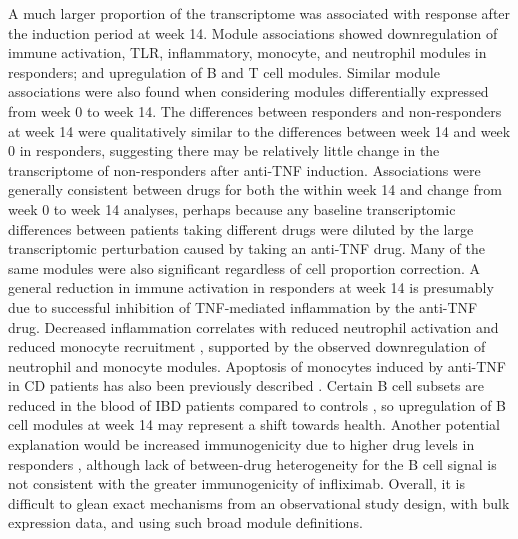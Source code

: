 A much larger proportion of the transcriptome was associated with response after the induction period at week 14.
Module associations
showed downregulation of immune activation, \gls{TLR}, inflammatory, monocyte, and neutrophil modules in responders;
and upregulation of B and T cell modules.
Similar module associations were also found when considering modules differentially expressed from week 0 to week 14.
The differences between responders and non-responders at week 14 
were qualitatively similar to the differences between week 14 and week 0 in responders,
suggesting there may be relatively little change in the transcriptome of non-responders after anti-\gls{TNF} induction.
Associations were generally consistent between drugs for both the within week 14 and change from week 0 to week 14 analyses,
perhaps because any baseline transcriptomic differences between patients taking different drugs 
were diluted by the large transcriptomic perturbation caused by taking an anti-\gls{TNF} drug.
Many of the same modules were also significant regardless of cell proportion correction.
%
A general reduction in immune activation in responders at week 14 is presumably due to successful inhibition of \gls{TNF}-mediated inflammation by the anti-\gls{TNF} drug.
%
%
%
Decreased inflammation correlates with reduced neutrophil activation and reduced monocyte recruitment \autocite{pramekumar2018PartnersCrimeNeutrophils},
supported by the observed downregulation of neutrophil and monocyte modules.
Apoptosis of monocytes induced by anti-\gls{TNF} in \gls{CD} patients has also been previously described \autocite{lugering2001InfliximabInducesApoptosis}.
Certain B cell subsets are reduced in the blood of \gls{IBD} patients compared to controls \autocite{pararasa2019ReducedCD27IgDCells}, 
so upregulation of B cell modules at week 14 may represent a shift towards health.
Another potential explanation would be increased immunogenicity due to higher drug levels in responders \autocite{kennedy2019PredictorsAntiTNFTreatment},
although lack of between-drug heterogeneity for the B cell signal is not consistent with the greater immunogenicity of infliximab.
Overall, it is difficult to glean exact mechanisms from an observational study design, with bulk expression data, and using such broad module definitions.

